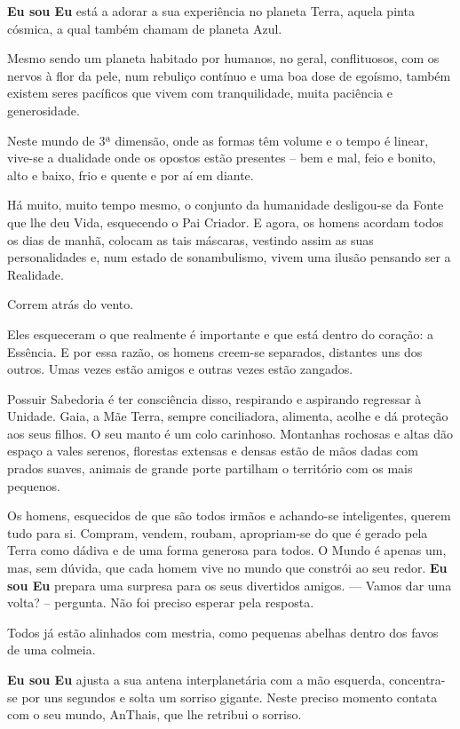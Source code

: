 
\textbf{Eu sou Eu} está a adorar a sua experiência no planeta Terra, aquela pinta cósmica, a qual também chamam de planeta Azul.

Mesmo sendo um planeta habitado por humanos, no geral, conflituosos, com os nervos à flor da pele, num rebuliço contínuo e uma boa dose de egoísmo, também existem seres pacíficos que vivem com tranquilidade, muita paciência e generosidade.

Neste mundo de 3ª dimensão, onde as formas têm volume e o tempo é linear, vive-se a dualidade onde os opostos estão presentes – bem e mal, feio e bonito, alto e baixo, frio e quente e por aí em diante.

Há muito, muito tempo mesmo, o conjunto da humanidade desligou-se da Fonte que lhe deu Vida, esquecendo o Pai Criador. E agora, os homens acordam todos os dias de manhã, colocam as tais máscaras, vestindo assim as suas personalidades e, num estado de sonambulismo, vivem uma ilusão pensando ser a Realidade.

Correm atrás do vento.

Eles esqueceram o que realmente é importante e que está dentro do coração: a Essência. E por essa razão, os homens creem-se separados, distantes uns dos outros. Umas vezes estão amigos e outras vezes estão zangados.

Possuir Sabedoria é ter consciência disso, respirando e aspirando regressar à Unidade.
\bigbreak
Gaia, a Mãe Terra, sempre conciliadora, alimenta, acolhe e dá proteção aos seus filhos. O seu manto é um colo carinhoso. Montanhas rochosas e altas dão espaço a vales serenos, florestas extensas e densas estão de mãos dadas com prados suaves, animais de grande porte partilham o território com os mais pequenos.

Os homens, esquecidos de que são todos irmãos e achando-se inteligentes, querem tudo para si.
Compram, vendem, roubam, apropriam-se do que é gerado pela Terra como dádiva e de uma forma generosa para todos.
\bigbreak
O Mundo é apenas um, mas, sem dúvida, que cada homem vive no mundo que constrói ao seu redor.
\bigbreak
\textbf{Eu sou Eu} prepara uma surpresa para os seus divertidos amigos.
\bigbreak
— Vamos dar uma volta? – pergunta.
\bigbreak
Não foi preciso esperar pela resposta.

Todos já estão alinhados com mestria, como pequenas abelhas dentro dos favos de uma colmeia.

\textbf{Eu sou Eu} ajusta a sua antena interplanetária com a mão esquerda, concentra-se por uns segundos e solta um sorriso gigante. Neste preciso momento contata com o seu mundo, AnThais, que lhe retribui o sorriso.

